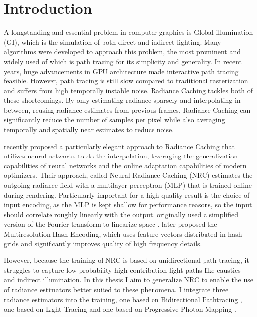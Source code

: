 
\chapter{Introduction}
\label{chap:intro}

A longstanding and essential problem in computer graphics is Global illumination (GI), which is the simulation of both direct and indirect lighting.
Many algorithms were developed to approach this problem, the most prominent and widely used of which is path tracing \parencite{kajiya1986} for its simplicity and generality.
In recent years, huge advancements in GPU architecture made interactive path tracing feasible.
However, path tracing is still slow compared to traditional rasterization and suffers from high temporally instable noise.
Radiance Caching \parencite{ward1988} tackles both of these shortcomings.
By only estimating radiance sparsely and interpolating in between, reusing radiance estimates from previous frames, Radiance Caching can significantly reduce the number of samples per pixel while also averaging temporally and spatially near estimates to reduce noise.

\textcite{muller2021} recently proposed a particularly elegant approach to Radiance Caching that utilizes neural networks to do the interpolation, leveraging the generalization capabilities of neural networks and the online adaptation capabilities of modern optimizers.
Their approach, called Neural Radiance Caching (NRC) estimates the outgoing radiance field with a multilayer perceptron (MLP) that is trained online during rendering.
Particularly important for a high quality result is the choice of input encoding, as the MLP is kept shallow for performance reasons, so the input should correlate roughly linearly with the output.
\textcite{muller2021} originally used a simplified version of the Fourier transform to linearize space \parencite{tancik2020}.
\textcite{muller2022} later proposed the Multiresolution Hash Encoding, which uses feature vectors distributed in hash-grids and significantly improves quality of high frequency details.

However, because the training of NRC is based on unidirectional path tracing, it struggles to capture low-probability high-contribution light paths like caustics and indirect illumination.
In this thesis I aim to generalize NRC to enable the use of radiance estimators better suited to these phenomena.
I integrate three radiance estimators into the training, one based on Bidirectional Pathtracing \parencite{lafortune1993}, one based on Light Tracing \parencite{arvo1986} and one based on Progressive Photon Mapping \parencite{hachisuka2008}.


